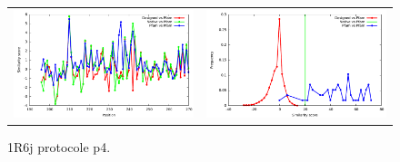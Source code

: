 \documentclass[a4paper,12pt]{article}
\begin{document}
   \begin{figure}[t]
     \centering
     \begin{tabular}{cc}
       \includegraphics[width=8.45cm]{gen_08032012/1R6J/p4/similarity_bypos.pdf} &
       \includegraphics[width=8.45cm]{gen_08032012/1R6J/p4/similarity_byseq_frequency.pdf} \\
     \end{tabular}
     
     \caption{1R6j protocole p4.}
     \label{1R6J}
   \end{figure}
\end{document}

